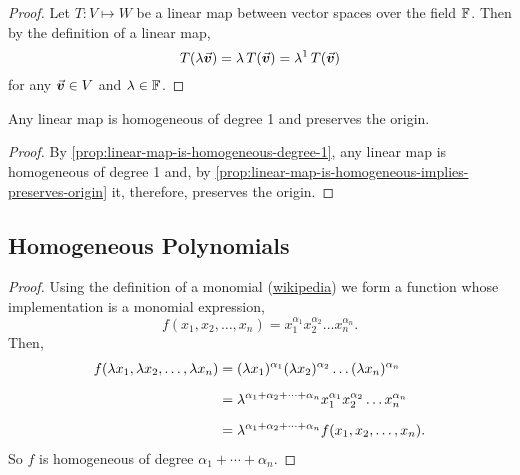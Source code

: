 \documentclass[../MathsNotesBase.tex]{subfiles}
\begin{document}
{		\bigskip
		\begin{tcolorbox}[breakable,enhanced jigsaw,colframe=white,colback=white,boxrule=0pt,arc=0pt,left=0pt,right=0pt,top=0pt,bottom=0pt]
			\begin{proof}
				Let ${ T: V \longmapsto W }$ be a linear map between vector spaces over the field $\mathbb{F}^{}$. Then by the definition of a linear map,
				\[ T(\lambda \vec{\bm{v}}) = \lambda \, T(\vec{\bm{v}}) = \lambda^1 \, T(\vec{\bm{v}}) \]
				for any ${ \vec{\bm{v}} \in V }$ and ${ \lambda \in \mathbb{F}^{} }$.
			\end{proof}
		\end{tcolorbox}
	
		\medskip
		\begin{corollary}\label{coro:linear-map-homogeneous-degree-1-and-preserves-origin}
			Any linear map is homogeneous of degree 1 and preserves the origin.
		\end{corollary}
		\begin{proof}
			By \autoref{prop:linear-map-is-homogeneous-degree-1}, any linear map is homogeneous of degree 1 and, by \autoref{prop:linear-map-is-homogeneous-implies-preserves-origin} it, therefore, preserves the origin.
		\end{proof}
	
	
		\biggerskip
		\subsection{Homogeneous Polynomials}
		\bigskip
	
		\bigskip
		\begin{tcolorbox}[breakable,enhanced jigsaw,colframe=white,colback=white,boxrule=0pt,arc=0pt,left=0pt,right=0pt,top=0pt,bottom=0pt]
			\begin{proof}
				Using the definition of a monomial (\href{https://en.wikipedia.org/wiki/Monomial}{wikipedia}) we form a function whose implementation is a monomial expression,
				\[ f(x_1, x_2, \dots, x_n) = x_1^{\alpha_1}x_2^{\alpha_2}\dots x_n^{\alpha_n}. \]
				Then,
				\[\begin{aligned}
					f(\lambda x_1, \lambda x_2, \dots, \lambda x_n) &= (\lambda x_1)^{\alpha_1}(\lambda x_2)^{\alpha_2}\dots (\lambda x_n)^{\alpha_n} \nn
					&= \lambda^{\alpha_1 + \alpha_2 + \cdots + \alpha_n} x_1^{\alpha_1}x_2^{\alpha_2}\dots x_n^{\alpha_n} \nn
					&= \lambda^{\alpha_1 + \alpha_2 + \cdots + \alpha_n} f(x_1, x_2, \dots, x_n).
				\end{aligned}\]
				So $f$ is homogeneous of degree ${ \alpha_1 + \cdots + \alpha_n }$.
			\end{proof}
		\end{tcolorbox}
	
}
\end{document}
